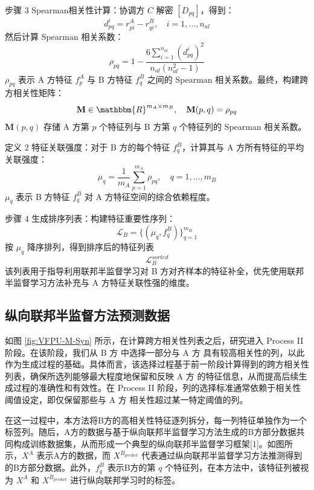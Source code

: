 步骤 3 Spearman相关性计算：协调方 $ C $ 解密 $ [D_{pq}] $，得到：
\begin{equation}
	d_{pq}^i = r^A_{pi} - r^B_{qi}, \quad i = 1, ..., n_{al}
\end{equation}
然后计算 Spearman 相关系数：
\begin{equation}
	\rho_{pq} = 1 - \frac{6\sum_{i=1}^{n_{al}} (d_{pq}^i)^2}{n_{al}(n_{al}^2 - 1)}
\end{equation}
$ \rho_{pq} $ 表示 A 方特征 $ f^A_p $ 与 B 方特征 $ f^B_q $ 之间的 Spearman 相关系数。最终，构建跨方相关性矩阵：
\begin{equation}
	\mathbf{M} \in \mathbbm{R}^{m_A \times m_B}, \quad \mathbf{M}(p,q) = \rho_{pq}
\end{equation}
$ \mathbf{M}(p,q) $ 存储 A 方第 $ p $ 个特征列与 B 方第 $ q $ 个特征列的 Spearman 相关系数。

定义 2 特征关联强度：对于 B 方的每个特征 $ f^B_q $，计算其与 A 方所有特征的平均关联强度：
\begin{equation}
	\mu_q = \frac{1}{m_A} \sum_{p=1}^{m_A} \rho_{pq}, \quad q=1,...,m_B
\end{equation}
$ \mu_q $ 表示 B 方特征 $ f^B_q $ 对 A 方特征空间的综合依赖程度。

步骤 4 生成排序列表：构建特征重要性序列：
\begin{equation}
	\mathcal{L}_B = \{(\mu_q, f^B_q)\}_{q=1}^{m_B}
\end{equation}
按 $ \mu_q $ 降序排列，得到排序后的特征列表
\begin{equation}
	\mathcal{L}_B^{sorted}
\end{equation}
该列表用于指导利用联邦半监督学习对 B 方对齐样本的特征补全，优先使用联邦半监督学习方法补充与 A 方特征关联性强的维度。
\subsection{纵向联邦半监督方法预测数据}
如图 \ref{fig:VFPU-M-Syn} 所示，在计算跨方相关性列表之后，研究进入 Process II 阶段。在该阶段，我们从 B 方 中选择一部分与 A 方 具有较高相关性的列，以此作为生成过程的基础。具体而言，该选择过程基于前一阶段计算得到的跨方相关性列表，确保所选列能够最大程度地保留和反映 A 方 的特征信息，从而提高后续生成过程的准确性和有效性。在 Process II 阶段，列的选择标准通常依赖于相关性阈值设定，即仅保留那些与 A 方 相关性超过某一特定阈值的列。

在这一过程中，本方法将B方的高相关性特征逐列拆分，每一列特征单独作为一个标签列。随后，A方的数据与基于纵向联邦半监督学习方法生成的B方部分数据共同构成训练数据集，从而形成一个典型的纵向联邦半监督学习框架[1]。如图所示，$X^A$ 表示A方的数据，而 ${{X}^{{{B}_{predict}}}}$ 代表通过纵向联邦半监督学习方法推测得到的B方部分数据。此外，$f_{q}^{B}$ 表示B方的第 $q$ 个特征列，在本方法中，该特征列被视为 $X^A$ 和 ${{X}^{{{B}_{predict}}}}$ 进行纵向联邦学习时的标签。

